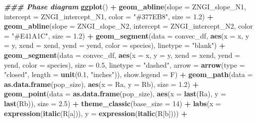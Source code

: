 \documentclass[
]{book}
\newenvironment{Shaded}{\begin{snugshade}}{\end{snugshade}}
\newcommand{\AttributeTok}[1]{\textcolor[rgb]{0.13,0.29,0.53}{#1}}
\newcommand{\DecValTok}[1]{\textcolor[rgb]{0.00,0.00,0.81}{#1}}
\newcommand{\DocumentationTok}[1]{\textcolor[rgb]{0.56,0.35,0.01}{\textbf{\textit{#1}}}}
\newcommand{\FloatTok}[1]{\textcolor[rgb]{0.00,0.00,0.81}{#1}}
\newcommand{\FunctionTok}[1]{\textcolor[rgb]{0.13,0.29,0.53}{\textbf{#1}}}
\newcommand{\NormalTok}[1]{#1}
\newcommand{\SpecialCharTok}[1]{\textcolor[rgb]{0.81,0.36,0.00}{\textbf{#1}}}
\newcommand{\StringTok}[1]{\textcolor[rgb]{0.31,0.60,0.02}{#1}}
\begin{document}
\begin{Shaded}
\begin{Highlighting}[]
\DocumentationTok{\#\#\# Phase diagram}
\FunctionTok{ggplot}\NormalTok{() }\SpecialCharTok{+} 
  \FunctionTok{geom\_abline}\NormalTok{(}\AttributeTok{slope =}\NormalTok{ ZNGI\_slope\_N1, }\AttributeTok{intercept =}\NormalTok{ ZNGI\_intercept\_N1, }\AttributeTok{color =} \StringTok{"\#377EB8"}\NormalTok{, }\AttributeTok{size =} \FloatTok{1.2}\NormalTok{) }\SpecialCharTok{+} 
  \FunctionTok{geom\_abline}\NormalTok{(}\AttributeTok{slope =}\NormalTok{ ZNGI\_slope\_N2, }\AttributeTok{intercept =}\NormalTok{ ZNGI\_intercept\_N2, }\AttributeTok{color =} \StringTok{"\#E41A1C"}\NormalTok{, }\AttributeTok{size =} \FloatTok{1.2}\NormalTok{) }\SpecialCharTok{+} 
  \FunctionTok{geom\_segment}\NormalTok{(}\AttributeTok{data =}\NormalTok{ convec\_df, }\FunctionTok{aes}\NormalTok{(}\AttributeTok{x =}\NormalTok{ x, }\AttributeTok{y =}\NormalTok{ y, }\AttributeTok{xend =}\NormalTok{ xend, }\AttributeTok{yend =}\NormalTok{ yend, }\AttributeTok{color =}\NormalTok{ species), }\AttributeTok{linetype =} \StringTok{"blank"}\NormalTok{) }\SpecialCharTok{+} 
  \FunctionTok{geom\_segment}\NormalTok{(}\AttributeTok{data =}\NormalTok{ convec\_df, }\FunctionTok{aes}\NormalTok{(}\AttributeTok{x =}\NormalTok{ x, }\AttributeTok{y =}\NormalTok{ y, }\AttributeTok{xend =}\NormalTok{ xend, }\AttributeTok{yend =}\NormalTok{ yend, }\AttributeTok{color =}\NormalTok{ species), }\AttributeTok{size =} \FloatTok{0.5}\NormalTok{, }\AttributeTok{linetype =} \StringTok{"dashed"}\NormalTok{, }\AttributeTok{arrow =} \FunctionTok{arrow}\NormalTok{(}\AttributeTok{type =} \StringTok{"closed"}\NormalTok{, }\AttributeTok{length =} \FunctionTok{unit}\NormalTok{(}\FloatTok{0.1}\NormalTok{, }\StringTok{"inches"}\NormalTok{)), }\AttributeTok{show.legend =}\NormalTok{ F) }\SpecialCharTok{+}
  \FunctionTok{geom\_path}\NormalTok{(}\AttributeTok{data =} \FunctionTok{as.data.frame}\NormalTok{(pop\_size), }\FunctionTok{aes}\NormalTok{(}\AttributeTok{x =}\NormalTok{ Ra, }\AttributeTok{y =}\NormalTok{ Rb), }\AttributeTok{size =} \FloatTok{1.2}\NormalTok{) }\SpecialCharTok{+}
  \FunctionTok{geom\_point}\NormalTok{(}\AttributeTok{data =} \FunctionTok{as.data.frame}\NormalTok{(pop\_size), }\FunctionTok{aes}\NormalTok{(}\AttributeTok{x =} \FunctionTok{last}\NormalTok{(Ra), }\AttributeTok{y =} \FunctionTok{last}\NormalTok{(Rb)), }\AttributeTok{size =} \FloatTok{2.5}\NormalTok{) }\SpecialCharTok{+}
  \FunctionTok{theme\_classic}\NormalTok{(}\AttributeTok{base\_size =} \DecValTok{14}\NormalTok{) }\SpecialCharTok{+}
  \FunctionTok{labs}\NormalTok{(}\AttributeTok{x =} \FunctionTok{expression}\NormalTok{(}\FunctionTok{italic}\NormalTok{(R[a])), }\AttributeTok{y =} \FunctionTok{expression}\NormalTok{(}\FunctionTok{italic}\NormalTok{(R[b]))) }\SpecialCharTok{+}

\end{Highlighting}
\end{Shaded}
\end{document}
